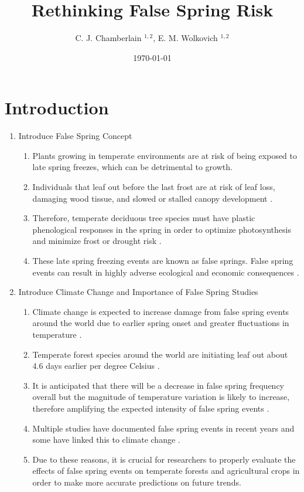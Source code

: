 \documentclass{article}\usepackage[]{graphicx}\usepackage[]{color}
\begin{document}
\title{Rethinking False Spring Risk}
\author{C. J. Chamberlain $^{1,2}$, E. M. Wolkovich $^{1,2}$}
\date{\today}
\maketitle 
 

\renewcommand{\thetable}{\arabic{table}}
\renewcommand{\thefigure}{\arabic{figure}}
\renewcommand{\labelitemi}{$-$}

\section*{Introduction}
\begin{enumerate}
\item Introduce False Spring Concept
\begin {enumerate}
\item Plants growing in temperate environments are at risk of being exposed to late spring freezes, which can be detrimental to growth. 
\item Individuals that leaf out before the last frost are at risk of leaf loss, damaging wood tissue, and slowed or stalled canopy development \citep{Gu2008, Hufkens2012}. 
\item Therefore, temperate deciduous tree species must have plastic phenological responses in the spring in order to optimize photosynthesis and minimize frost or drought risk \citep{Polgar2011}. 
\item These late spring freezing events are known as false springs. False spring events can result in highly adverse ecological and economic consequences \citep{Ault2013, Knudson2012}.
\end{enumerate}
\item Introduce Climate Change and Importance of False Spring Studies
\begin{enumerate}
\item Climate change is expected to increase damage from false spring events around the world due to earlier spring onset and greater fluctuations in temperature \citep{Martin2010, Inouye2008, Cannell1986}. 
\item Temperate forest species around the world are initiating leaf out about 4.6 days earlier per degree Celsius \citep{Polgar2014, Wolkovich2012}. 
\item It is anticipated that there will be a decrease in false spring frequency overall but the magnitude of temperature variation is likely to increase, therefore amplifying the expected intensity of false spring events \citep{Allstadt2015, Kodra2011}. 
\item Multiple studies have documented false spring events in recent years \citep{Augspurger2013, Knudson2012, Augspurger2009, Gu2008} and some have linked this to climate change \citep{Muffler2016, Xin2016, Allstadt2015, Ault2013}. 
\item Due to these reasons, it is crucial for researchers to properly evaluate the effects of false spring events on temperate forests and agricultural crops in order to make more accurate predictions on future trends.
\end{enumerate}


\end{enumerate}
\end{document}
